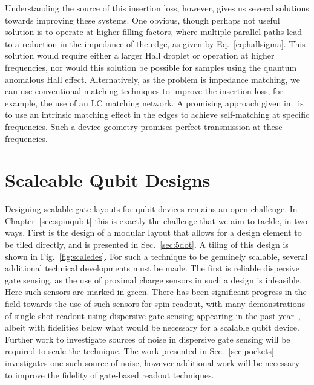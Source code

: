 Understanding the source of this insertion loss, however, gives us several solutions towards improving these systems. One obvious, though perhaps
not useful solution is to operate at higher filling factors, where multiple parallel paths lead to a reduction in the impedance of the edge, as
given by Eq.~\ref{eq:hallsigma}. This solution would require either a larger Hall droplet or operation at higher frequencies, nor would this solution
be possible for samples using the quantum anomalous Hall effect. Alternatively, as the problem is impedance matching, we can use conventional matching
techniques to improve the insertion loss, for example, the use of an LC matching network. A promising approach given in~\cite{bosco2016self} is to use
an intrinsic matching effect in the edges to achieve self-matching at specific frequencies. Such a device geometry promises perfect transmission at these
frequencies.

\section{Scaleable Qubit Designs}
Designing scalable gate layouts for qubit devices remains an open challenge. In Chapter~\ref{sec:spinqubit} this is exactly the challenge that we aim to
tackle, in two ways. First is the design of a modular layout that allows for a design element to be tiled directly, and is presented in Sec.~\ref{sec:5dot}.
A tiling of this design is shown in Fig.~\ref{fig:scaledes}. For such a technique to be genuinely scalable, several additional technical developments
must be made. The first is reliable dispersive gate sensing, as the use of proximal charge sensors in such a design is infeasible. Here such sensors are marked in green.
There has been significant progress in the field towards the use of such sensors for spin readout, with many demonstrations of single-shot readout using dispersive
gate sensing appearing in the past year~\cite{Nnano_dzurak,PhysRevApplied.11.044061}, albeit with fidelities below what would be necessary for a scalable qubit
device. Further work to investigate sources of noise in dispersive gate sensing will be required to scale the technique. The work presented in Sec.~\ref{sec:pockets}
investigates one such source of noise, however additional work will be necessary to improve the fidelity of gate-based readout techniques.

